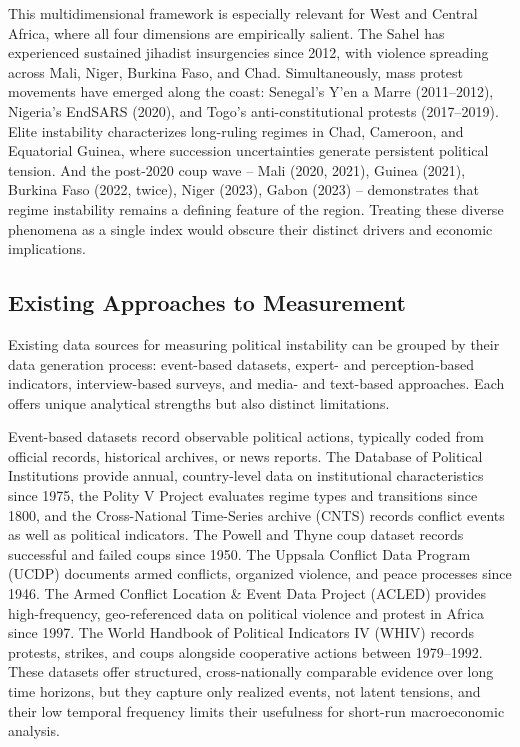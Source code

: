 \documentclass[12pt,a4paper,fleqn]{article}
\begin{document}
This multidimensional framework is especially relevant for West and Central Africa, where all four dimensions are empirically salient. The Sahel has experienced sustained jihadist insurgencies since 2012, with violence spreading across Mali, Niger, Burkina Faso, and Chad. Simultaneously, mass protest movements have emerged along the coast: Senegal's Y'en a Marre (2011--2012), Nigeria's EndSARS (2020), and Togo's anti-constitutional protests (2017--2019). Elite instability characterizes long-ruling regimes in Chad, Cameroon, and Equatorial Guinea, where succession uncertainties generate persistent political tension. And the post-2020 coup wave -- Mali (2020, 2021), Guinea (2021), Burkina Faso (2022, twice), Niger (2023), Gabon (2023) -- demonstrates that regime instability remains a defining feature of the region. Treating these diverse phenomena as a single index would obscure their distinct drivers and economic implications.


\subsection{Existing Approaches to Measurement}\label{sec:existing}

Existing data sources for measuring political instability can be grouped by their data generation process: event-based datasets, expert- and perception-based indicators, interview-based surveys, and media- and text-based approaches. Each offers unique analytical strengths but also distinct limitations.

Event-based datasets record observable political actions, typically coded from official records, historical archives, or news reports. The Database of Political Institutions \citep{Beck2001} provide annual, country-level data on institutional characteristics since 1975, the Polity V Project \citep{marshall2020} evaluates regime types and transitions since 1800, and the Cross-National Time-Series archive (CNTS) \citep{banks2013cross} records conflict events as well as political indicators. The Powell and Thyne coup dataset \citep{POWELL2011} records successful and failed coups since 1950. The Uppsala Conflict Data Program (UCDP) \citep{sundberg2012} documents armed conflicts, organized violence, and peace processes since 1946. The Armed Conflict Location \& Event Data Project (ACLED) \citep{raleigh2010} provides high-frequency, geo-referenced data on political violence and protest in Africa since 1997. The World Handbook of Political Indicators IV (WHIV) \citep{jenkins2012} records protests, strikes, and coups alongside cooperative actions between 1979--1992. These datasets offer structured, cross-nationally comparable evidence over long time horizons, but they capture only realized events, not latent tensions, and their low temporal frequency limits their usefulness for short-run macroeconomic analysis.
\end{document}
